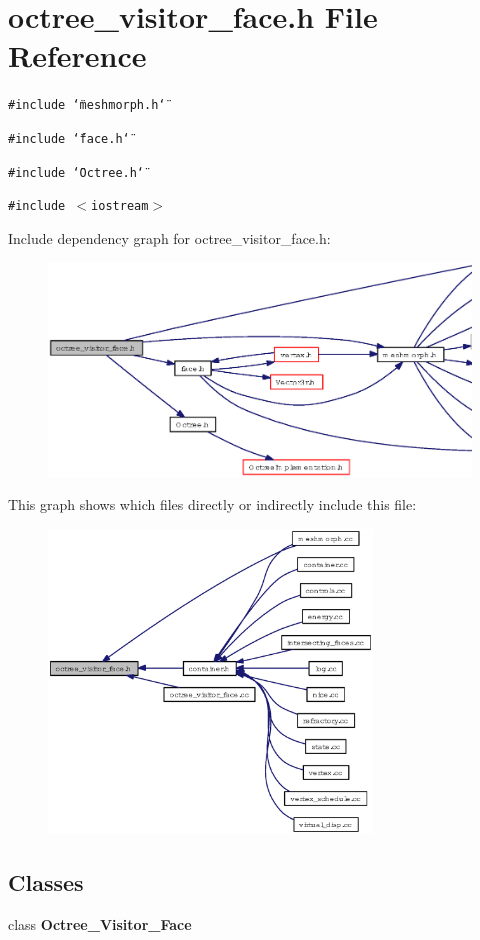 \section{octree\_\-visitor\_\-face.h File Reference}
\label{octree__visitor__face_8h}
{\tt \#include \char`\"{}meshmorph.h\char`\"{}}\par
{\tt \#include \char`\"{}face.h\char`\"{}}\par
{\tt \#include \char`\"{}Octree.h\char`\"{}}\par
{\tt \#include $<$iostream$>$}\par


Include dependency graph for octree\_\-visitor\_\-face.h:\begin{figure}[H]
\begin{center}
\leavevmode
\includegraphics[width=343pt]{octree__visitor__face_8h__incl}
\end{center}
\end{figure}


This graph shows which files directly or indirectly include this file:\begin{figure}[H]
\begin{center}
\leavevmode
\includegraphics[width=244pt]{octree__visitor__face_8h__dep__incl}
\end{center}
\end{figure}
\subsection*{Classes}
\begin{CompactItemize}
\item 
class {\bf Octree\_\-Visitor\_\-Face}
\end{CompactItemize}
